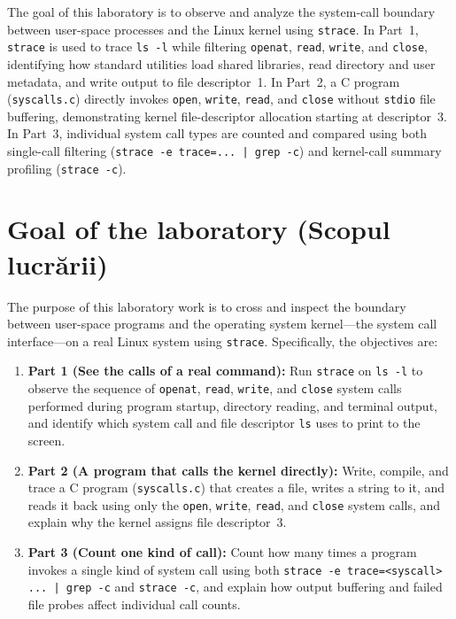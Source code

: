\documentclass{../latex/utmreport}
\providecommand{\tightlist}{\setlength{\itemsep}{0pt}\setlength{\parskip}{0pt}}
\begin{document}
\makeutmreporttitlepage
\tableofcontents
\clearpage
\begin{utmabstract}[Abstract]
The goal of this laboratory is to observe and analyze the system-call boundary between user-space processes and the Linux kernel using \texttt{strace}. In Part~1, \texttt{strace} is used to trace \texttt{ls -l} while filtering \texttt{openat}, \texttt{read}, \texttt{write}, and \texttt{close}, identifying how standard utilities load shared libraries, read directory and user metadata, and write output to file descriptor~1. In Part~2, a C program (\texttt{syscalls.c}) directly invokes \texttt{open}, \texttt{write}, \texttt{read}, and \texttt{close} without \texttt{stdio} file buffering, demonstrating kernel file-descriptor allocation starting at descriptor~3. In Part~3, individual system call types are counted and compared using both single-call filtering (\texttt{strace -e trace=... | grep -c}) and kernel-call summary profiling (\texttt{strace -c}).
\end{utmabstract}
\utmintroduction

\section*{Goal of the laboratory (Scopul lucrării)}

The purpose of this laboratory work is to cross and inspect the boundary between user-space programs and the operating system kernel—the system call interface—on a real Linux system using \texttt{strace}. Specifically, the objectives are:
\begin{enumerate}
\tightlist
\item \textbf{Part 1 (See the calls of a real command):} Run \texttt{strace} on \texttt{ls -l} to observe the sequence of \texttt{openat}, \texttt{read}, \texttt{write}, and \texttt{close} system calls performed during program startup, directory reading, and terminal output, and identify which system call and file descriptor \texttt{ls} uses to print to the screen.
\item \textbf{Part 2 (A program that calls the kernel directly):} Write, compile, and trace a C program (\texttt{syscalls.c}) that creates a file, writes a string to it, and reads it back using only the \texttt{open}, \texttt{write}, \texttt{read}, and \texttt{close} system calls, and explain why the kernel assigns file descriptor~3.
\item \textbf{Part 3 (Count one kind of call):} Count how many times a program invokes a single kind of system call using both \texttt{strace -e trace=<syscall> ... | grep -c} and \texttt{strace -c}, and explain how output buffering and failed file probes affect individual call counts.
\end{enumerate}
\end{document}
